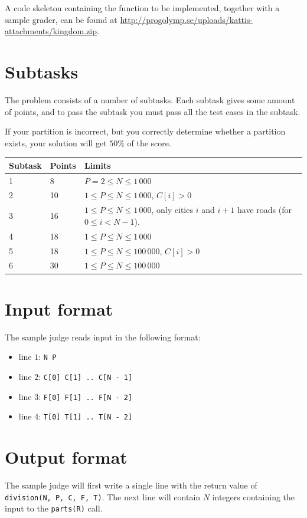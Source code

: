 A code skeleton containing the function to be implemented, together with a sample grader, can be found at
\url{http://progolymp.se/uploads/kattis-attachments/kingdom.zip}.

\section*{Subtasks}
The problem consists of a number of subtasks. Each subtask gives some amount of points, and to pass
the subtask you must pass all the test cases in the subtask.

If your partition is incorrect, but you correctly determine whether a partition exists, your solution
will get $50\%$ of the score. 

\begin{tabular}{|l|l|l|}
  \hline
  \textbf{Subtask} & \textbf{Points} & \textbf{Limits} \\ \hline
  1 & 8 & $P = 2 \le N \le 1\,000$ \\ \hline
  2 & 10 & $1 \le P \le N \le 1\,000$, $C[i] > 0$ \\ \hline
  3 & 16 & $1 \le P \le N \le 1\,000$, only cities $i$ and $i + 1$ have roads (for $0 \le i < N - 1$). \\ \hline
  4 & 18 & $1 \le P \le N \le 1\,000$ \\ \hline
  5 & 18 & $1 \le P \le N \le 100\,000$, $C[i] > 0$ \\ \hline
  6 & 30 & $1 \le P \le N \le 100\,000$ \\ \hline
\end{tabular}

\section*{Input format}
The sample judge reads input in the following format:

\begin{itemize}
  \item line $1$: \texttt{N P}
  \item line $2$: \texttt{C[0] C[1] .. C[N - 1]}
  \item line $3$: \texttt{F[0] F[1] .. F[N - 2]}
  \item line $4$: \texttt{T[0] T[1] .. T[N - 2]}
\end{itemize}

\section*{Output format}
The sample judge will first write a single line with the return value of \texttt{division(N, P, C, F, T)}. The next line will contain $N$ integers containing the input to the \texttt{parts(R)} call.
